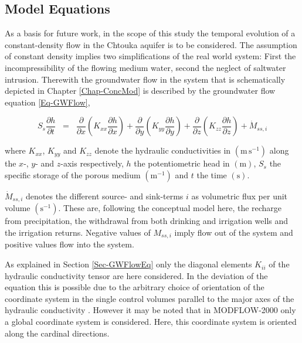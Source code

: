 
\subsection{Model Equations}
\label{Sec-ModEq}

As a basis for future work, in the scope of this study the temporal evolution of a constant-density flow in the Chtouka aquifer is to be considered. 
The assumption of constant density implies two simplifications of the real world system: First the incompressibility of the flowing medium water, second the neglect of saltwater intrusion. 
Therewith the groundwater flow in the system that is schematically depicted in Chapter \ref{Chap-ConcMod} is described by the groundwater flow equation \eqref{Eq-GWFlow},

\begin{equation}
    S_s \frac{\partial h}{\partial t} \; \; = \; \; \frac{\partial}{\partial x} \left(K_{xx} \frac{\partial h}{\partial x} \right) + \frac{\partial}{\partial y} \left(K_{yy} \frac{\partial h}{\partial y} \right) + \frac{\partial}{\partial z} \left(K_{zz} \frac{\partial h}{\partial z} \right) + \dot{M}_{ss,i}
\end{equation}

where $K_{xx}$, $K_{yy}$ and $K_{zz}$ denote the hydraulic conductivities in $\left( \textrm{m} \, \textrm{s}^{-1} \right)$ along the $x$-, $y$- and $z$-axis respectively, $h$ the potentiometric head in $\left( \textrm{m} \right)$, $S_s$ the specific storage of the porous medium $\left( \textrm{m}^{-1} \right)$ and $t$ the time $\left( \textrm{s} \right)$.

$\dot{M}_{ss,i}$ denotes the different source- and sink-terms $i$ as volumetric flux per unit volume $\left( \textrm{s}^{-1} \right)$. 
These are, following the conceptual model here, the recharge from precipitation, the withdrawal from both drinking and irrigation wells and the irrigation returns. 
Negative values of $M_{ss,i}$ imply flow out of the system and positive values flow into the system.

As explained in Section \ref{Sec-GWFlowEq} only the diagonal elements $K_{ii}$ of the hydraulic conductivity tensor are here considered. 
In the deviation of the equation this is possible due to the arbitrary choice of orientation of the coordinate system in the single control volumes parallel to the major axes of the hydraulic conductivity \parencite{Harbaugh.2000}. 
However it may be noted that in MODFLOW-2000 only a global coordinate system is considered. 
Here, this coordinate system is oriented along the cardinal directions.

